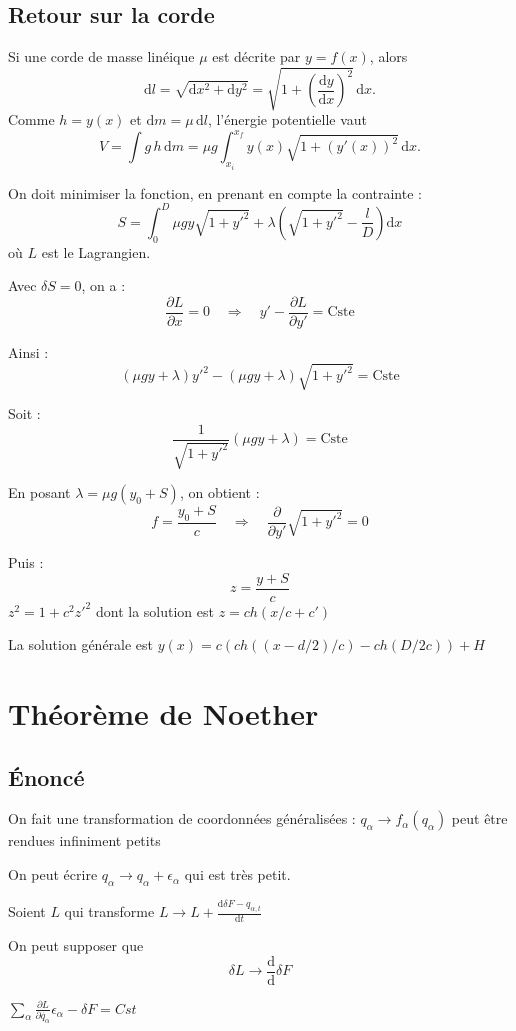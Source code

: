 \documentclass[french]{yLectureNote}
\newcommand{\dd}{\mathrm{d}}
\begin{document}
\subsection{Retour sur la corde}
Si une corde de masse linéique $\mu$ est décrite par $y=f(x)$, alors
\[
\dd l=\sqrt{\dd x^2+\dd y^2}
=\sqrt{1+\left(\frac{\dd y}{\dd x}\right)^2}\,\dd x.
\]
Comme $h=y(x)$ et $\dd m=\mu\,\dd l$, l'énergie potentielle vaut
\[
V=\int g\,h\,\dd m
=\mu g\int_{x_i}^{x_f} y(x)\sqrt{1+\left(y'(x)\right)^2}\,\dd x.
\]

On doit minimiser la fonction, en prenant en compte la contrainte :
\[
S = \int_{0}^{D} \mu g y \sqrt{1 + y'^2} + \lambda \left(\sqrt{1 + y'^2} - \frac{l}{D}\right) \dd x
\]
où $L$ est le Lagrangien.

Avec $\delta S = 0$, on a :
\[
\frac{\partial L}{\partial x} = 0 \quad \Rightarrow \quad y' - \frac{\partial L}{\partial y'} = \text{Cste}
\]

Ainsi :
\[
(\mu g y + \lambda) y'^2 - (\mu g y + \lambda) \sqrt{1 + y'^2} = \text{Cste}
\]

Soit :
\[
\frac{1}{\sqrt{1 + y'^2}} (\mu g y + \lambda) = \text{Cste}
\]

En posant $\lambda = \mu g (y_0 + S)$, on obtient :
\[
f = \frac{y_0 + S}{c} \quad \Rightarrow \quad \frac{\partial}{\partial y'}\sqrt{1 + y'^2} = 0
\]

Puis :
\[
z = \frac{y + S}{c}
\]
$z^2 = 1+c^2z'^2$ dont la solution est $z=ch(x/c + c')$

La solution générale est $y(x) = c(ch((x-d/2)/c)-ch(D/2c))+H$

\section{Théorème de Noether}
\subsection{Énoncé}
On fait une transformation de coordonnées généralisées :
$q_{\alpha}\to f_{\alpha}(q_{\alpha})$ peut être rendues infiniment petits

On peut écrire $q_{\alpha} \to q_{\alpha}+\epsilon_{\alpha}$ qui est très petit.

Soient $L$ qui transforme $L\to L + \frac{\dd \delta F-q_{\alpha,t}}{\dd t}$

On peut supposer que 
$$\delta L\to \frac{\dd}{\dd}\delta F$$

\begin{theorem}
    $\sum_{\alpha}\frac{\partial L}{\partial \dot{q_{\alpha}}}\epsilon_{\alpha}-\delta F=Cst$
\end{theorem}
\end{document}
